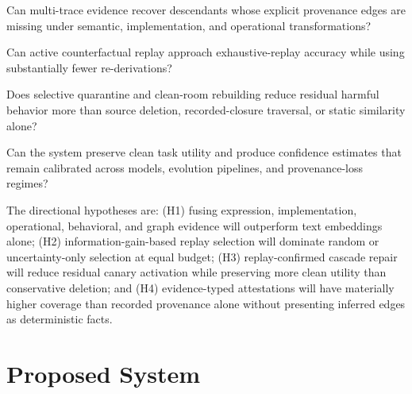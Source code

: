 \documentclass[11pt]{article}
\begin{document}
\begin{description}[leftmargin=1.4em,labelindent=0pt,style=nextline]
\item[RQ1: Hidden-descendant recovery.] Can multi-trace evidence recover descendants whose explicit provenance edges are missing under semantic, implementation, and operational transformations?
\item[RQ2: Causal confirmation under budget.] Can active counterfactual replay approach exhaustive-replay accuracy while using substantially fewer re-derivations?
\item[RQ3: Revocation effectiveness.] Does selective quarantine and clean-room rebuilding reduce residual harmful behavior more than source deletion, recorded-closure traversal, or static similarity alone?
\item[RQ4: Utility and calibration.] Can the system preserve clean task utility and produce confidence estimates that remain calibrated across models, evolution pipelines, and provenance-loss regimes?
\end{description}

The directional hypotheses are: (H1) fusing expression, implementation, operational, behavioral, and graph evidence will outperform text embeddings alone; (H2) information-gain-based replay selection will dominate random or uncertainty-only selection at equal budget; (H3) replay-confirmed cascade repair will reduce residual canary activation while preserving more clean utility than conservative deletion; and (H4) evidence-typed attestations will have materially higher coverage than recorded provenance alone without presenting inferred edges as deterministic facts.

\section{Proposed System}
\end{document}
